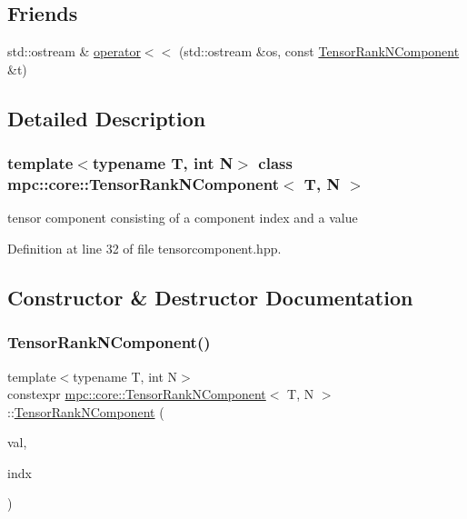 \subsection*{Friends}
\begin{DoxyCompactItemize}
\item 
std\+::ostream \& \mbox{\hyperlink{classmpc_1_1core_1_1_tensor_rank_n_component_aeecda552ac00ef38d6ff442f48718c6b}{operator$<$$<$}} (std\+::ostream \&os, const \mbox{\hyperlink{classmpc_1_1core_1_1_tensor_rank_n_component}{Tensor\+Rank\+N\+Component}} \&t)
\end{DoxyCompactItemize}


\subsection{Detailed Description}
\subsubsection*{template$<$typename T, int N$>$\newline
class mpc\+::core\+::\+Tensor\+Rank\+N\+Component$<$ T, N $>$}

tensor component consisting of a component index and a value 

Definition at line 32 of file tensorcomponent.\+hpp.



\subsection{Constructor \& Destructor Documentation}
\mbox{\label{classmpc_1_1core_1_1_tensor_rank_n_component_a57477ad47a9e4039f314f777bc337488}} 
\subsubsection{\texorpdfstring{Tensor\+Rank\+N\+Component()}{TensorRankNComponent()}}
{\footnotesize\ttfamily template$<$typename T, int N$>$ \\
constexpr \mbox{\hyperlink{classmpc_1_1core_1_1_tensor_rank_n_component}{mpc\+::core\+::\+Tensor\+Rank\+N\+Component}}$<$ T, N $>$\+::\mbox{\hyperlink{classmpc_1_1core_1_1_tensor_rank_n_component}{Tensor\+Rank\+N\+Component}} (\begin{DoxyParamCaption}\item[{T}]{val,  }\item[{\mbox{\hyperlink{classmpc_1_1core_1_1_tensor_rank_n_component_index}{Tensor\+Rank\+N\+Component\+Index}}$<$ N $>$}]{indx }\end{DoxyParamCaption})\hspace{0.3cm}{\ttfamily [inline]}}



